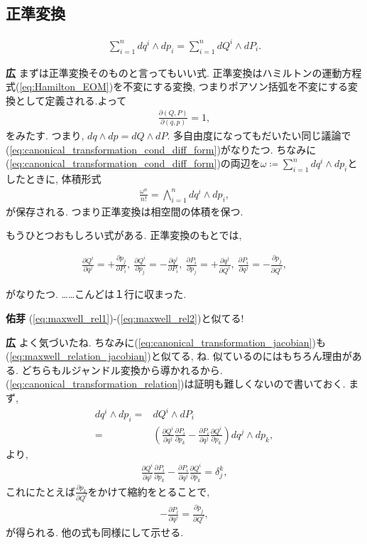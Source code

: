 \documentclass{ltjsarticle}
\theoremstyle{definition}
\newcommand{\parno}{\par\noindent}
\begin{document}
\subsection{正準変換}
\begin{tcolorbox}
\begin{gather}
\sum_{i=1}^ndq^i\wedge dp_i=\sum_{i=1}^ndQ^i\wedge dP_i.\label{eq:canonical_transformation_cond_diff_form}
\end{gather}
\end{tcolorbox}
\parno
\textbf{広} まずは正準変換そのものと言ってもいい式. 正準変換はハミルトンの運動方程式(\ref{eq:Hamilton_EOM})を不変にする変換, つまりポアソン括弧を不変にする変換として定義される.よって
\begin{align}
  \frac{\partial(Q,P)}{\partial(q,p)}=1,\label{eq:canonical_transformation_jacobian}
\end{align}
をみたす. つまり, $dq\wedge dp=dQ\wedge dP$. 多自由度になってもだいたい同じ議論で(\ref{eq:canonical_transformation_cond_diff_form})がなりたつ. ちなみに(\ref{eq:canonical_transformation_cond_diff_form})の両辺を$\omega\coloneqq\sum_{i=1}^ndq^i\wedge dp_i$としたときに, 体積形式
\begin{gather}
\frac{\omega^n}{n!}=\bigwedge_{i=1}^ndq^i\wedge dp_i,
\end{gather}
が保存される. つまり正準変換は相空間の体積を保つ.\par
もうひとつおもしろい式がある. 正準変換のもとでは,
\begin{tcolorbox}
\begin{gather}
\frac{\partial Q^i}{\partial q^j}=+\frac{\partial p_j}{\partial P_i},\ \frac{\partial Q^i}{\partial p_j}=-\frac{\partial q^j}{\partial P_i},\ \frac{\partial P_i}{\partial p_j}=+\frac{\partial q^j}{\partial Q^i},\ \frac{\partial P_i}{\partial q^j}=-\frac{\partial p_j}{\partial Q^i},\label{eq:canonical_transformation_relation}
\end{gather}
\end{tcolorbox}
\parno
がなりたつ. ……こんどは１行に収まった.\parno
\textbf{佑芽} (\ref{eq:maxwell_rel1})-(\ref{eq:maxwell_rel2})と似てる!\parno
\textbf{広} よく気づいたね. ちなみに(\ref{eq:canonical_transformation_jacobian})も(\ref{eq:maxwell_relation_jacobian})と似てる, ね. 似ているのにはもちろん理由がある. どちらもルジャンドル変換から導かれるから. (\ref{eq:canonical_transformation_relation})は証明も難しくないので書いておく. まず,
\begin{align}
  dq^i\wedge dp_i=&dQ^i\wedge dP_i\\
  =&\left(\frac{\partial Q^i}{\partial q^j}\frac{\partial P_i}{\partial p_k}-\frac{\partial P_i}{\partial q^j}\frac{\partial Q^i}{\partial p_k}\right)dq^j\wedge dp_k,
\end{align}
より,
\begin{align}
  \frac{\partial Q^i}{\partial q^j}\frac{\partial P_i}{\partial p_k}-\frac{\partial P_i}{\partial q^j}\frac{\partial Q^i}{\partial p_k}=\delta_j^k,
\end{align}
これにたとえば$\displaystyle\frac{\partial p_k}{\partial Q^l}$をかけて縮約をとることで,
\begin{align}
  -\frac{\partial P_l}{\partial q^j}=\frac{\partial p_j}{\partial Q^l},
\end{align}
が得られる. 他の式も同様にして示せる.
\end{document}
